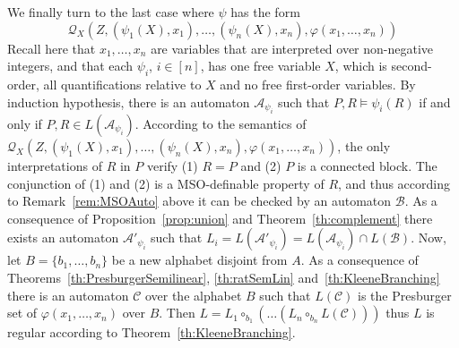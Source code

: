 \documentclass{CSML}
\begin{document}
We finally turn to the last case where $\psi$ has the form $$\mathcal{Q}_X(Z,(\psi_1(X),x_1),\dots,(\psi_n(X),x_n),\varphi(x_1,\dots,x_n))$$
Recall here that $x_1,\dots,x_n$ are variables that are interpreted over non-negative integers, and that each $\psi_i$, $i\in[n]$, has one free variable $X$, which is second-order, all quantifications relative to $X$ and no free first-order variables. By induction hypothesis, there is an automaton $\mathcal{A}_{\psi_i}$ such that $P,R\models\psi_i(R)$ if and only if $P,R\in L(\mathcal{A}_{\psi_i})$. According to the semantics of $\mathcal{Q}_X(Z,(\psi_1(X),x_1),\dots,(\psi_n(X),x_n),\varphi(x_1,\dots,x_n))$, the only interpretations of $R$ in $P$ verify (1) $R=P$ and (2) $P$ is a connected block. The conjunction of (1) and (2) is a MSO-definable property of $R$, and thus according to Remark~\ref{rem:MSOAuto} above it can be checked by an automaton $\mathcal{B}$. As a consequence of Proposition~\ref{prop:union} and Theorem~\ref{th:complement} there exists an automaton $\mathcal{A}'_{\psi_i}$ such that $L_i=L(\mathcal{A}'_{\psi_i})=L(\mathcal{A}_{\psi_i})\cap L(\mathcal{B})$. 
Now, let $B=\{b_1,\dots,b_n\}$ be a new alphabet disjoint from $A$. As a consequence of Theorems~\ref{th:PresburgerSemilinear}, \ref{th:ratSemLin} and~\ref{th:KleeneBranching} there is an automaton $\mathcal{C}$ over the alphabet $B$ such that $L(\mathcal{C})$ is the Presburger set of $\varphi(x_1,\dots,x_n)$ over $B$. Then
$L=L_1\circ_{b_1}(\dots(L_n\circ_{b_n}L(\mathcal{C})))$
thus $L$ is regular according to Theorem~\ref{th:KleeneBranching}.
\end{document}
